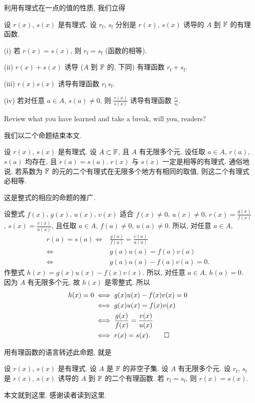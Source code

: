 利用有理式在一点的值的性质, 我们立得
\begin{proposition}
    设 $r(x)$, $s(x)$ 是有理式. 设 $r_\mathrm{f}$, $s_\mathrm{f}$ 分别是 $r(x)$, $s(x)$ 诱导的 $A$ 到 $\mathbb{F}$ 的有理函数.

    (i) 若 $r(x) = s(x)$, 则 $r_\mathrm{f} = s_\mathrm{f}$ (函数的相等).

    (ii) $r(x) + s(x)$ 诱导 ($A$ 到 $\mathbb{F}$ 的, 下同) 有理函数 $r_\mathrm{f} + s_\mathrm{f}$.

    (iii) $r(x) s(x)$ 诱导有理函数 $r_\mathrm{f} \, s_\mathrm{f}$.

    (iv) 若对任意 $a \in A$, $s(a) \neq 0$, 则 $\frac{r(x)}{s(x)}$ 诱导有理函数 $\frac{r_\mathrm{f}}{s_\mathrm{f}}$.
\end{proposition}

Review what you have learned and take a break, will you, readers?

\myLine

我们以二个命题结束本文.

\begin{proposition}
    设 $r(x)$, $s(x)$ 是有理式. 设 $A \subset \mathbb{F}$, 且 $A$ 有无限多个元. 设任取 $a \in A$, $r(a)$, $s(a)$ 均存在, 且 $r(a) = s(a)$. $r(x)$ 与 $s(x)$ 一定是相等的有理式. 通俗地说, 若系数为 $\mathbb{F}$ 的元的二个有理式在无限多个地方有相同的取值, 则这二个有理式必相等.
\end{proposition}

\begin{remark}
    这是整式的相应的命题的推广.
\end{remark}

\begin{pf}
    设整式 $f(x)$, $g(x)$, $u(x)$, $v(x)$ 适合 $f(x) \neq 0$, $u(x) \neq 0$, $r(x) = \frac{g(x)}{f(x)}$, $s(x) = \frac{v(x)}{u(x)}$, 且任取 $a \in A$, $f(a) \neq 0$, $u(a) \neq 0$. 所以, 对任意 $a \in A$,
    \begin{align*}
        r(a) = s(a)
        \iff {} & \frac{g(a)}{f(a)} = \frac{v(a)}{u(a)} \\
        \iff {} & g(a) u(a) = f(a) v(a)                 \\
        \iff {} & g(a) u(a) - f(a) v(a) = 0.
    \end{align*}
    作整式 $h(x) = g(x) u(x) - f(x) v(x)$. 所以, 对任意 $a \in A$, $h(a) = 0$. 因为 $A$ 有无限多个元, 故 $h(x)$ 是零整式. 所以
    \begin{align*}
        h(x) = 0
        \iff {} & g(x) u(x) - f(x) v(x) = 0             \\
        \iff {} & g(x) u(x) = f(x) v(x)                 \\
        \iff {} & \frac{g(x)}{f(x)} = \frac{v(x)}{u(x)} \\
        \iff {} & r(x) = s(x). \qedhere
    \end{align*}
\end{pf}

用有理函数的语言转述此命题, 就是
\begin{proposition}
    设 $r(x)$, $s(x)$ 是有理式. 设 $A$ 是 $\mathbb{F}$ 的非空子集. 设 $A$ 有无限多个元. 设 $r_{\mathrm{f}}$, $s_{\mathrm{f}}$ 是 $r(x)$, $s(x)$ 诱导的 $A$ 到 $\mathbb{F}$ 的二个有理函数. 若 $r_{\mathrm{f}} = s_{\mathrm{f}}$, 则 $r(x) = s(x)$.
\end{proposition}

本文就到这里. 感谢读者读到这里.
